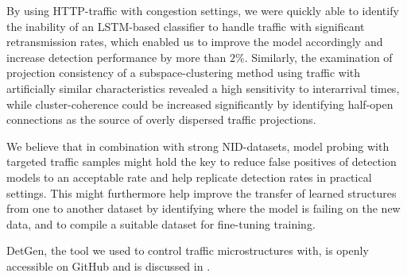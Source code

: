 \documentclass[10pt,conference]{IEEEtran}
\begin{document}
By using HTTP-traffic with congestion settings, we were quickly able to identify the inability of an LSTM-based classifier to handle traffic with significant retransmission rates, which enabled us to improve the model accordingly and increase detection performance by more than $2\%$. Similarly, the examination of projection consistency of a subspace-clustering method using traffic with artificially similar characteristics revealed a high sensitivity to interarrival times, while cluster-coherence could be increased significantly by identifying half-open connections as the source of overly dispersed traffic projections. 

We believe that in combination with strong NID-datasets, model probing with targeted traffic samples might hold the key to reduce false positives of detection models to an acceptable rate and help replicate detection rates in practical settings. This might furthermore help improve the transfer of learned structures from one to another dataset by identifying where the model is failing on the new data, and to compile a suitable dataset for fine-tuning training.

DetGen, the tool we used to control traffic microstructures with, is openly accessible on GitHub and is discussed in \cite{clausen2020traffic}. 


\end{document}
